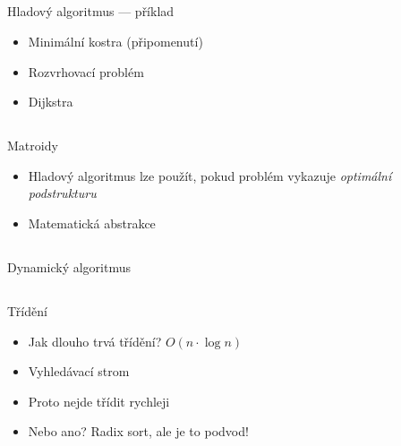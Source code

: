 \documentclass{beamer}
\begin{document}
\subsection{}
\begin{frame}{Hladový algoritmus --- příklad}
\begin{itemize}
\item Minimální kostra (připomenutí)
\item Rozvrhovací problém
\item Dijkstra
\end{itemize}
\end{frame}

\subsection{}
\begin{frame}{Matroidy}
\begin{itemize}
\item Hladový algoritmus lze použít, pokud problém vykazuje {\em optimální podstrukturu}
\item Matematická abstrakce
\end{itemize}
\end{frame}

\subsection{}
\begin{frame}{Dynamický algoritmus}
\end{frame}

\subsection{}
\begin{frame}{Třídění}
\begin{itemize}
\item Jak dlouho trvá třídění? $O(n\cdot\log n)$
\item Vyhledávací strom
\item Proto nejde třídit rychleji
\item Nebo ano? Radix sort, ale je to podvod!
\end{itemize}
\end{frame}
\end{document}
